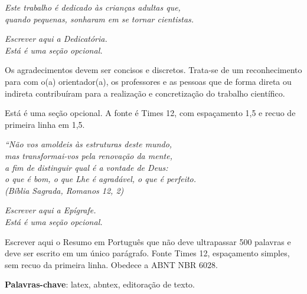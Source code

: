 \documentclass[
	12pt,				%
	openright,			%
	oneside,			%
	a4paper,			%
	sumario=tradicional, %
	english,			%
	french,				%
	spanish,			%
	brazil				%
	]{uastex}
\begin{document}
\begin{dedicatoria}
   \vspace*{\fill}
   \centering
   \noindent
   \vspace*{\fill}
   \begin{flushright}
	   \textit{Este trabalho é dedicado às crianças adultas que,\\quando pequenas, sonharam em se tornar cientistas.}
   \end{flushright}
   \begin{flushright}
   		\textit{Escrever aqui a Dedicatória.\\Está é uma seção opcional.}
   \end{flushright}
\end{dedicatoria}

\begin{agradecimentos}
Os agradecimentos devem ser concisos e discretos. Trata-se de um reconhecimento para com o(a) orientador(a), os professores e as pessoas que de forma direta ou indireta contribuíram para a realização e  concretização do trabalho científico.

Está é uma seção opcional. A fonte é Times 12, com espaçamento 1,5 e recuo de primeira linha em 1,5.

\end{agradecimentos}

\begin{epigrafe}
    \vspace*{\fill}
	\begin{flushright}
		\textit{``Não vos amoldeis às estruturas deste mundo, \\
		mas transformai-vos pela renovação da mente, \\
		a fim de distinguir qual é a vontade de Deus: \\
		o que é bom, o que Lhe é agradável, o que é perfeito.\\
		(Bíblia Sagrada, Romanos 12, 2)}
	\end{flushright}
	\begin{flushright}
		\textit{Escrever aqui a Epígrafe.\\Está é uma seção opcional.}
	\end{flushright}
\end{epigrafe}


\setlength{\absparsep}{18pt} %
\begin{resumo}
Escrever aqui o Resumo em Português que não deve ultrapassar 500 palavras e deve ser escrito em um único parágrafo. Fonte Times 12, espaçamento simples, sem recuo da primeira linha. Obedece a ABNT NBR 6028.

\textbf{Palavras-chave}: latex, abntex, editoração de texto.
\end{resumo}
\end{document}
